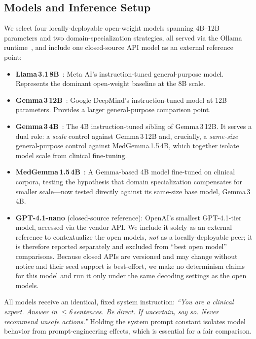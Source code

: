 \documentclass[11pt]{article}
\begin{document}
\subsection{Models and Inference Setup}

We select four locally-deployable open-weight models spanning
4B--12B parameters and two domain-specialization strategies, all served
via the Ollama runtime~\cite{ollama}, and include one closed-source API
model as an external reference point:

\begin{itemize}
  \item \textbf{Llama\,3.1\,8B}~\cite{dubey2024llama3}:
        Meta AI's instruction-tuned general-purpose model.
        Represents the dominant open-weight baseline at the 8B scale.
  \item \textbf{Gemma\,3\,12B}~\cite{team2024gemma}:
        Google DeepMind's instruction-tuned model at 12B parameters.
        Provides a larger general-purpose comparison point.
  \item \textbf{Gemma\,3\,4B}~\cite{team2024gemma}:
        The 4B instruction-tuned sibling of Gemma\,3\,12B. It serves a
        dual role: a \emph{scale} control against Gemma\,3\,12B and,
        crucially, a \emph{same-size} general-purpose control against
        MedGemma\,1.5\,4B, which together isolate model scale from
        clinical fine-tuning.
  \item \textbf{MedGemma\,1.5\,4B}~\cite{medgemma2024}:
        A Gemma-based 4B model fine-tuned on clinical corpora,
        testing the hypothesis that domain specialization compensates
        for smaller scale---now tested directly against its same-size
        base model, Gemma\,3\,4B.
  \item \textbf{GPT-4.1-nano} (closed-source reference):
        OpenAI's smallest GPT-4.1-tier model, accessed via the vendor
        API. We include it solely as an external reference to
        contextualize the open models, \emph{not} as a locally-deployable
        peer; it is therefore reported separately and excluded from
        ``best open model'' comparisons. Because closed APIs are
        versioned and may change without notice and their seed support is
        best-effort, we make no determinism claims for this model and run
        it only under the same decoding settings as the open models.
\end{itemize}

All models receive an identical, fixed system instruction:
\textit{``You are a clinical expert. Answer in $\leq$6\,sentences.
Be direct. If uncertain, say so. Never recommend unsafe actions.''}
Holding the system prompt constant isolates model behavior from
prompt-engineering effects, which is essential for a fair comparison.
\end{document}
